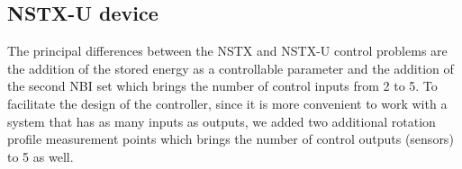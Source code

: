 \documentclass[12pt,lot, lof]{puthesis}
\begin{document}
%
%
%
%

\subsection{NSTX-U device}

The principal differences between the NSTX and NSTX-U control problems are the addition of the stored energy as a controllable parameter and the addition of the second NBI set which brings the number of control inputs from 2 to 5. To facilitate the design of the controller, since it is more convenient to work with a system that has as many inputs as outputs, we added two additional rotation profile measurement points which brings the number of control outputs (sensors) to 5 as well.
\end{document}
